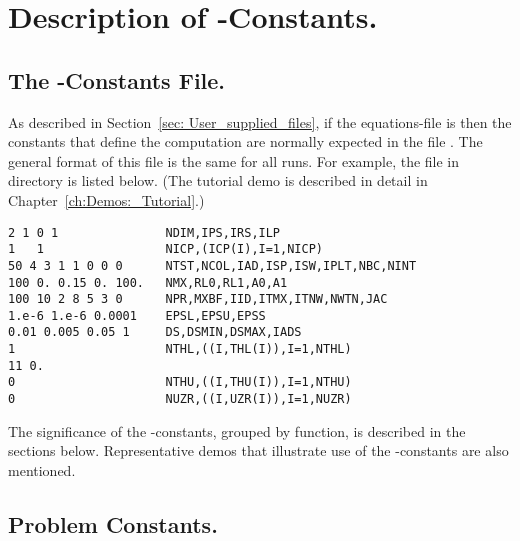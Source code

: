 \chapter{ Description of \AUTO-Constants.} \label{ch:AUTO_constants}
\section{ The \AUTO-Constants File.} \label{sec:The_AUTO_constants_file}
As described in Section~\ref{sec: User_supplied_files}, 
if the equations-file is  
then the constants that define the computation 
are normally expected in the file  .
The general format of this file is the same for all \AUTO runs.
For example, the file  
in directory  is listed below.
(The tutorial demo  is described in detail in 
Chapter~\ref{ch:Demos:_Tutorial}.)  

\begin{verbatim}
2 1 0 1               NDIM,IPS,IRS,ILP
1   1                 NICP,(ICP(I),I=1,NICP)
50 4 3 1 1 0 0 0      NTST,NCOL,IAD,ISP,ISW,IPLT,NBC,NINT
100 0. 0.15 0. 100.   NMX,RL0,RL1,A0,A1
100 10 2 8 5 3 0      NPR,MXBF,IID,ITMX,ITNW,NWTN,JAC
1.e-6 1.e-6 0.0001    EPSL,EPSU,EPSS
0.01 0.005 0.05 1     DS,DSMIN,DSMAX,IADS
1                     NTHL,((I,THL(I)),I=1,NTHL)
11 0.
0                     NTHU,((I,THU(I)),I=1,NTHU)
0                     NUZR,((I,UZR(I)),I=1,NUZR)
\end{verbatim}

The significance of the \AUTO-constants, grouped by function, is 
described in the sections below. 
Representative demos that illustrate use of the \AUTO-constants
are also mentioned.

\section{ Problem Constants.} \label{sec:Problem_constants}
\subsection{}  \label{sec:NDIM}

